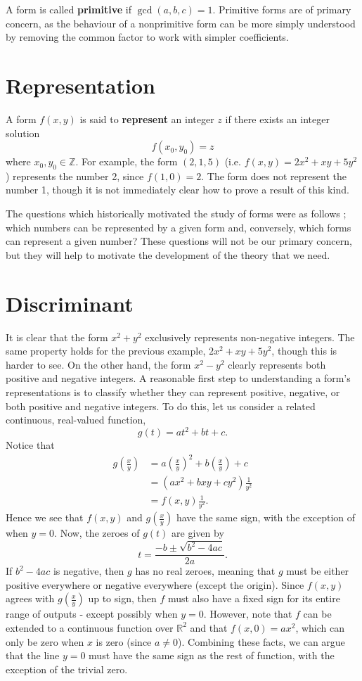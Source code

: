\documentclass[honours,12pt]{unswthesis}
\newcommand{\Z}{\mathbb{Z}} %
\newcommand{\R}{\mathbb{R}} %
\numberwithin{equation}{section}
\begin{document}
A form is called \textbf{primitive} if $\gcd(a, b, c) = 1$. 
Primitive forms are of primary concern, as the behaviour of a nonprimitive form can be more simply understood by removing the common factor to work with simpler coefficients.


\section{Representation}\label{s-forms-rep}

A form $f(x, y)$ is said to \textbf{represent} an integer $z$ if there exists an integer solution
$$f(x_0, y_0) = z$$
where $x_0, y_0 \in \Z$.
For example, the form $(2, 1, 5)$ (i.e. $f(x, y) = 2x^2 + xy + 5y^2$) represents the number 2, since $f(1, 0) = 2$.
The form does not represent the number 1, though it is not immediately clear how to prove a result of this kind.

The questions which historically motivated the study of forms were as follows \cite[Ch.\,1]{buell};
which numbers can be represented by a given form and, conversely, which forms can represent a given number?
These questions will not be our primary concern, but they will help to motivate the development of the theory that we need.


\pagebreak
\section{Discriminant}\label{s-forms-disc}

It is clear that the form $x^2 + y^2$ exclusively represents non-negative integers. 
The same property holds for the previous example, $2x^2 + xy + 5y^2$, though this is harder to see.
On the other hand, the form $x^2 - y^2$ clearly represents both positive and negative integers.
A reasonable first step to understanding a form's representations is to classify whether they can represent positive, negative, or both positive and negative integers.
To do this, let us consider a related continuous, real-valued function, 
$$g(t) = at^2 + bt + c.$$
Notice that
\begin{align*}
    g\left(\frac{x}{y}\right) &= a\left(\frac{x}{y}\right)^2 + b\left(\frac{x}{y}\right) + c \\
    &= \left(ax^2 + bxy + cy^2\right)\frac{1}{y^2} \\
    &= f(x, y) \frac{1}{y^2}.
\end{align*}
Hence we see that $f(x, y)$ and $g(\tfrac{x}{y})$ have the same sign, with the exception of when $y=0$.
Now, the zeroes of $g(t)$ are given by
$$t = \frac{-b \pm \sqrt{b^2 - 4ac}}{2a}.$$
If $b^2 -4ac$ is negative, then $g$ has no real zeroes, meaning that $g$ must be either positive everywhere or negative everywhere (except the origin).
Since $f(x, y)$ agrees with $g(\tfrac{x}{y})$ up to sign, then $f$ must also have a fixed sign for its entire range of outputs - except possibly when $y=0$.
However, note that $f$ can be extended to a continuous function over $\R^2$ and that $f(x, 0) = ax^2$, which can only be zero when $x$ is zero (since $a \neq 0$).
Combining these facts, we can argue that the line $y=0$ must have the same sign as the rest of function, with the exception of the trivial zero.
\end{document}
